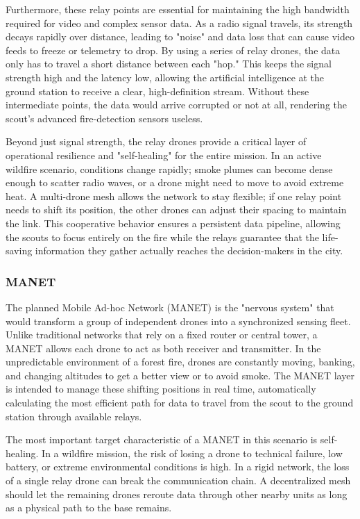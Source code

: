 \documentclass[journal, onecolumn]{IEEEtran}
\begin{document}
Furthermore, these relay points are essential for maintaining the high bandwidth required for video and complex sensor data. As a radio signal travels, its strength decays rapidly over distance, leading to "noise" and data loss that can cause video feeds to freeze or telemetry to drop. By using a series of relay drones, the data only has to travel a short distance between each "hop." This keeps the signal strength high and the latency low, allowing the artificial intelligence at the ground station to receive a clear, high-definition stream. Without these intermediate points, the data would arrive corrupted or not at all, rendering the scout’s advanced fire-detection sensors useless.

Beyond just signal strength, the relay drones provide a critical layer of operational resilience and "self-healing" for the entire mission. In an active wildfire scenario, conditions change rapidly; smoke plumes can become dense enough to scatter radio waves, or a drone might need to move to avoid extreme heat. A multi-drone mesh allows the network to stay flexible; if one relay point needs to shift its position, the other drones can adjust their spacing to maintain the link. This cooperative behavior ensures a persistent data pipeline, allowing the scouts to focus entirely on the fire while the relays guarantee that the life-saving information they gather actually reaches the decision-makers in the city.

\subsubsection{MANET}

The planned Mobile Ad-hoc Network (MANET) is the "nervous system" that would transform a group of independent drones into a synchronized sensing fleet. Unlike traditional networks that rely on a fixed router or central tower, a MANET allows each drone to act as both receiver and transmitter. In the unpredictable environment of a forest fire, drones are constantly moving, banking, and changing altitudes to get a better view or to avoid smoke. The MANET layer is intended to manage these shifting positions in real time, automatically calculating the most efficient path for data to travel from the scout to the ground station through available relays.

The most important target characteristic of a MANET in this scenario is self-healing. In a wildfire mission, the risk of losing a drone to technical failure, low battery, or extreme environmental conditions is high. In a rigid network, the loss of a single relay drone can break the communication chain. A decentralized mesh should let the remaining drones reroute data through other nearby units as long as a physical path to the base remains.
\end{document}
